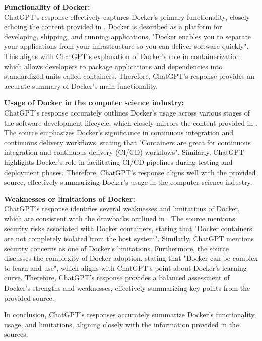 \documentclass[a4paper, 11pt]{report}
\begin{document}
\textbf{Functionality of Docker:} \\
\noindent ChatGPT's response effectively captures Docker's primary functionality, closely echoing the content provided in \cite{dockeroverview}. Docker is described as a platform for developing, shipping, and running applications, "Docker enables you to separate your applications from your infrastructure so you can deliver software quickly". This aligns with ChatGPT's explanation of Docker's role in containerization, which allows developers to package applications and dependencies into standardized units called containers. Therefore, ChatGPT's response provides an accurate summary of Docker's main functionality.

\textbf{Usage of Docker in the computer science industry:} \\
\noindent ChatGPT's response accurately outlines Docker's usage across various stages of the software development lifecycle, which closely mirrors the content provided in \cite{dockeroverview}. The source emphasizes Docker's significance in continuous integration and continuous delivery workflows, stating that "Containers are great for continuous integration and continuous delivery (CI/CD) workflows". Similarly, ChatGPT highlights Docker's role in facilitating CI/CD pipelines during testing and deployment phases. Therefore, ChatGPT's response aligns well with the provided source, effectively summarizing Docker's usage in the computer science industry.

\textbf{Weaknesses or limitations of Docker: } \\
\noindent ChatGPT's response identifies several weaknesses and limitations of Docker, which are consistent with the drawbacks outlined in \cite{dockerlimits}. The source mentions security risks associated with Docker containers, stating that "Docker containers are not completely isolated from the host system". Similarly, ChatGPT mentions security concerns as one of Docker's limitations. Furthermore, the source discusses the complexity of Docker adoption, stating that "Docker can be complex to learn and use", which aligns with ChatGPT's point about Docker's learning curve. Therefore, ChatGPT's response provides a balanced assessment of Docker's strengths and weaknesses, effectively summarizing key points from the provided source.

In conclusion, ChatGPT's responses accurately summarize Docker's functionality, usage, and limitations, aligning closely with the information provided in the sources. 
\end{document}
